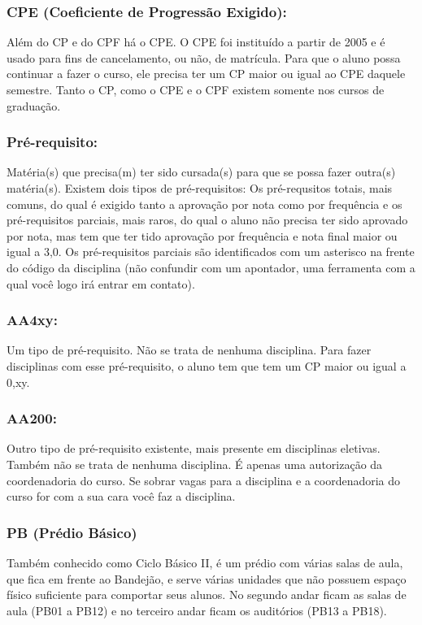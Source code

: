 \subsubsection{CPE (Coeficiente de Progressão Exigido):} Além do CP e do CPF há
o CPE. O CPE foi instituído a partir de 2005 e é usado para fins de
cancelamento, ou não, de matrícula. Para que o aluno possa continuar a fazer o
curso, ele precisa ter um CP maior ou igual ao CPE daquele semestre. Tanto o
CP, como o CPE e o CPF existem somente nos cursos de graduação.

\subsubsection{Pré-requisito:} Matéria(s) que precisa(m) ter sido cursada(s)
para que se possa fazer outra(s) matéria(s). Existem dois tipos de
pré-requisitos: Os pré-requsitos totais, mais comuns, do qual é exigido tanto a
aprovação por nota como por frequência e os pré-requisitos parciais, mais
raros, do qual o aluno não precisa ter sido aprovado por nota, mas tem que ter
tido aprovação por frequência e nota final maior ou igual a 3,0. Os
pré-requisitos parciais são identificados com um asterisco na frente do código
da disciplina (não confundir com um apontador, uma ferramenta com a qual você
logo irá entrar em contato).

\subsubsection{AA4xy:} Um tipo de pré-requisito. Não se trata de nenhuma
disciplina. Para fazer disciplinas com esse pré-requisito, o aluno tem que tem
um CP maior ou igual a 0,xy.

\subsubsection{AA200:} Outro tipo de pré-requisito existente, mais presente em
disciplinas eletivas. Também não se trata de nenhuma disciplina. É apenas uma
autorização da coordenadoria do curso. Se sobrar vagas para a disciplina e a
coordenadoria do curso for com a sua cara você faz a disciplina.

\subsubsection{PB (Prédio Básico)} Também conhecido como Ciclo Básico II, é um
prédio com várias salas de aula, que fica em frente ao Bandejão, e serve várias
unidades que não possuem espaço físico suficiente para comportar seus alunos.
No segundo andar ficam as salas de aula (PB01 a PB12) e no terceiro andar ficam
os auditórios (PB13 a PB18).

